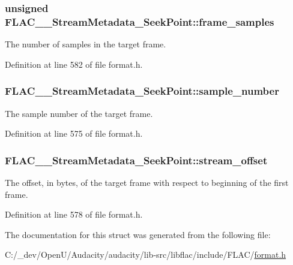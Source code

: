 \subsubsection[{\texorpdfstring{frame\+\_\+samples}{frame_samples}}]{\setlength{\rightskip}{0pt plus 5cm}unsigned F\+L\+A\+C\+\_\+\+\_\+\+Stream\+Metadata\+\_\+\+Seek\+Point\+::frame\+\_\+samples}\hypertarget{struct_f_l_a_c_____stream_metadata___seek_point_a247ce3f0d45a56c202e623742309fe61}{}\label{struct_f_l_a_c_____stream_metadata___seek_point_a247ce3f0d45a56c202e623742309fe61}
The number of samples in the target frame. 

Definition at line 582 of file format.\+h.

\subsubsection[{\texorpdfstring{sample\+\_\+number}{sample_number}}]{ F\+L\+A\+C\+\_\+\+\_\+\+Stream\+Metadata\+\_\+\+Seek\+Point\+::sample\+\_\+number}\hypertarget{struct_f_l_a_c_____stream_metadata___seek_point_a96a62923f1443fd3a5a3498e701e6ecf}{}\label{struct_f_l_a_c_____stream_metadata___seek_point_a96a62923f1443fd3a5a3498e701e6ecf}
The sample number of the target frame. 

Definition at line 575 of file format.\+h.

\subsubsection[{\texorpdfstring{stream\+\_\+offset}{stream_offset}}]{ F\+L\+A\+C\+\_\+\+\_\+\+Stream\+Metadata\+\_\+\+Seek\+Point\+::stream\+\_\+offset}\hypertarget{struct_f_l_a_c_____stream_metadata___seek_point_a6028398e99f937b002618af677d32c9f}{}\label{struct_f_l_a_c_____stream_metadata___seek_point_a6028398e99f937b002618af677d32c9f}
The offset, in bytes, of the target frame with respect to beginning of the first frame. 

Definition at line 578 of file format.\+h.



The documentation for this struct was generated from the following file\+:\begin{DoxyCompactItemize}
\item 
C\+:/\+\_\+dev/\+Open\+U/\+Audacity/audacity/lib-\/src/libflac/include/\+F\+L\+A\+C/\hyperlink{include_2_f_l_a_c_2format_8h}{format.\+h}\end{DoxyCompactItemize}
